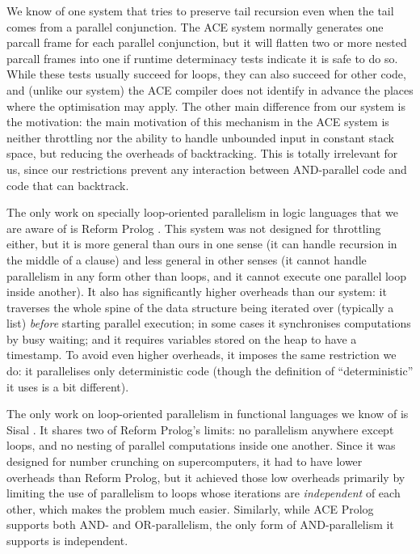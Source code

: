 We know of one system that tries to preserve tail recursion
even when the tail comes from a parallel conjunction.
The ACE system \citep{gupta01:optimization_for_parallel_nodet_code}
normally generates one parcall frame for each parallel conjunction,
but it will flatten two or more nested parcall frames into one
if runtime determinacy tests indicate it is safe to do so.
While these tests usually succeed for loops,
they can also succeed for other code,
and (unlike our system) the ACE compiler does not identify in advance
the places where the optimisation may apply.
The other main difference from our system is the motivation:
the main motivation of this mechanism in the ACE system is
neither throttling
nor the ability to handle unbounded input in constant stack space,
but reducing the overheads of backtracking.
This is totally irrelevant for us,
since our restrictions prevent any interaction
between AND-parallel code and code that can backtrack.

The only work on specially loop-oriented parallelism in logic languages
that we are aware of is Reform Prolog \citep{bevemyr:reform}.
This system was not designed for throttling either,
but it is more general than ours in one sense
(it can handle recursion in the middle of a clause)
and less general in other senses
(it cannot handle parallelism in any form other than loops,
and it cannot execute one parallel loop inside another).
It also has significantly higher overheads than our system:
it traverses the whole spine of the data structure being iterated over
(typically a list) \emph{before} starting parallel execution;
in some cases it synchronises computations by busy waiting;
and it requires variables stored on the heap to have a timestamp.
To avoid even higher overheads,
it imposes the same restriction we do:
it parallelises only deterministic code
(though the definition of ``deterministic'' it uses is a bit different).

The only work on loop-oriented parallelism in functional languages
we know of is Sisal \citep{feo:1990:sisal-report}.
It shares two of Reform Prolog's limits:
no parallelism anywhere except loops, and
no nesting of parallel computations inside one another.
Since it was designed for number crunching on supercomputers,
it had to have lower overheads than Reform Prolog,
but it achieved those low overheads
primarily by limiting the use of parallelism
to loops whose iterations are \emph{independent} of each other,
which makes the problem much easier.
Similarly, while ACE Prolog supports both AND- and OR-parallelism,
the only form of AND-parallelism it supports is independent.

